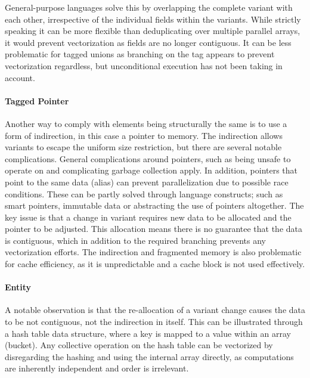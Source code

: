 \documentclass{article}
\begin{document}
General-purpose languages solve this by overlapping the complete variant with each other, irrespective of the individual fields within the variants.
While strictly speaking it can be more flexible than deduplicating over multiple parallel arrays, it would prevent vectorization as fields are no longer contiguous.
It can be less problematic for tagged unions as branching on the tag appears to prevent vectorization regardless, but unconditional execution has not been taking in account.

\paragraph{Tagged Pointer}

Another way to comply with elements being structurally the same is to use a form of indirection, in this case a pointer to memory.
The indirection allows variants to escape the uniform size restriction, but there are several notable complications.
General complications around pointers, such as being unsafe to operate on and complicating garbage collection apply.
In addition, pointers that point to the same data (alias) can prevent parallelization due to possible race conditions.
These can be partly solved through language constructs; such as smart pointers, immutable data or abstracting the use of pointers altogether.
The key issue is that a change in variant requires new data to be allocated and the pointer to be adjusted.
This allocation means there is no guarantee that the data is contiguous, which in addition to the required branching prevents any vectorization efforts.
The indirection and fragmented memory is also problematic for cache efficiency, as it is unpredictable and a cache block is not used effectively.

\newpage

\paragraph{Entity}

A notable observation is that the re-allocation of a variant change causes the data to be not contiguous, not the indirection in itself.
This can be illustrated through a hash table data structure, where a key is mapped to a value within an array (bucket).
Any collective operation on the hash table can be vectorized by disregarding the hashing and using the internal array directly, as computations are inherently independent and order is irrelevant.   
\end{document}
